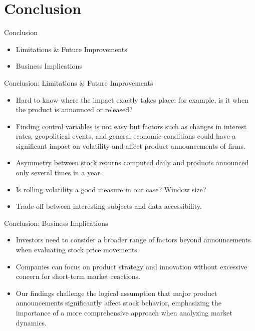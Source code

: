 \documentclass{beamer}
\begin{document}
\section{Conclusion}

\begin{frame}{Conclusion}
  \begin{itemize}
    \item Limitations \& Future Improvements
    \item Business Implications
  \end{itemize}
\end{frame}

\begin{frame}{Conclusion: Limitations \& Future Improvements}
  \begin{itemize}
    \item Hard to know where the impact exactly takes place: for example, is it when the product is announced or released?
    \item Finding control variables is not easy but factors such as changes in interest rates, geopolitical events, and general economic conditions could have a significant impact on volatility and affect product announcements of firms.
    \item Asymmetry between stock returns computed daily and products announced only several times in a year.
    \item Is rolling volatility a good measure in our case? Window size?
    \item Trade-off between interesting subjects and data accessibility.
  \end{itemize}
\end{frame}

\begin{frame}{Conclusion: Business Implications}
  \begin{itemize}
    \item  Investors need to consider a broader range of factors beyond announcements when evaluating stock price movements.
    \item Companies can focus on product strategy and innovation without excessive concern for short-term market reactions.
    \item Our findings challenge the logical assumption that major product announcements significantly affect stock behavior, emphasizing the importance of a more comprehensive approach when analyzing market dynamics.
  \end{itemize}
\end{frame}
\end{document}
